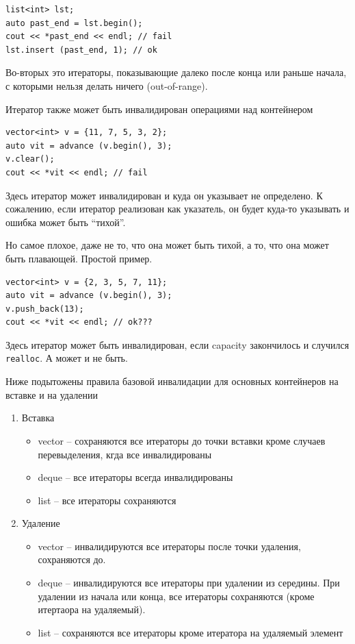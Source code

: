 \documentclass[a4paper,12pt,oneside]{article}
\begin{document}
\begin{lstlisting}
list<int> lst;
auto past_end = lst.begin();
cout << *past_end << endl; // fail
lst.insert (past_end, 1); // ok
\end{lstlisting}

Во-вторых это итераторы, показывающие далеко после конца или раньше начала, с которыми нельзя делать ничего (out-of-range).

Итератор также может быть инвалидирован операциями над контейнером

\begin{lstlisting}
vector<int> v = {11, 7, 5, 3, 2};
auto vit = advance (v.begin(), 3);
v.clear();
cout << *vit << endl; // fail
\end{lstlisting}

Здесь итератор может инвалидирован и куда он указывает не определено. К сожалению, если итератор реализован как указатель, он будет куда-то указывать и ошибка может быть ``тихой''.

Но самое плохое, даже не то, что она может быть тихой, а то, что она может быть плавающей. Простой пример.

\begin{lstlisting}
vector<int> v = {2, 3, 5, 7, 11};
auto vit = advance (v.begin(), 3);
v.push_back(13);
cout << *vit << endl; // ok???
\end{lstlisting}

Здесь итератор может быть инвалидирован, если capacity закончилось и случился \lstinline!realloc!. А может и не быть.

Ниже подытожены правила базовой инвалидации для основных контейнеров на вставке и на удалении

\begin{enumerate}
\item Вставка
\begin{itemize}
\item vector -- сохраняются все итераторы до точки вставки кроме случаев перевыделения, кгда все инвалидированы
\item deque -- все итераторы всегда инвалидированы
\item list -- все итераторы сохраняются
\end{itemize}
\item Удаление
\begin{itemize}
\item vector – инвалидируются все итераторы после точки удаления, сохраняются до.
\item deque – инвалидируются все итераторы при удалении из середины. При удалении из начала или конца, все итераторы сохраняются (кроме итертаора на удаляемый).
\item list – сохраняются все итераторы кроме итератора на удаляемый элемент
\end{itemize}
\end{enumerate}
\end{document}
